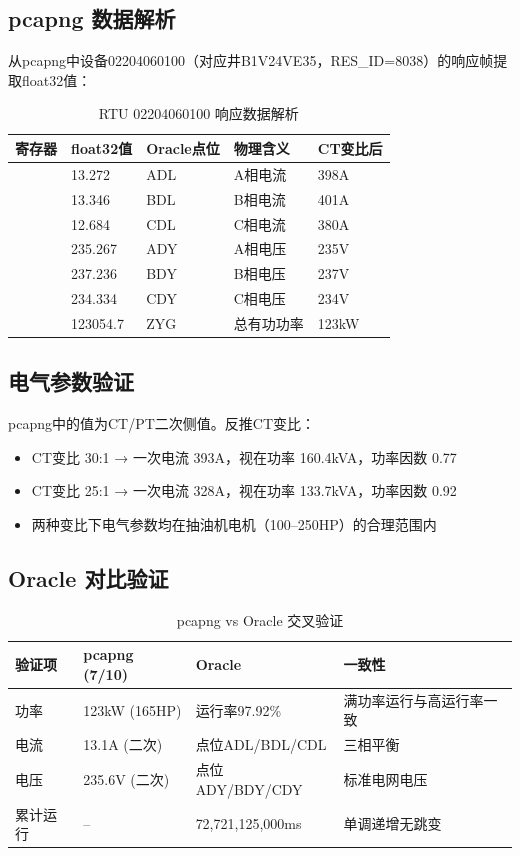 \documentclass[12pt,a4paper]{ctexart}
\begin{document}
\subsection{pcapng 数据解析}

从pcapng中设备02204060100（对应井B1V24VE35，RES\_ID=8038）的响应帧提取float32值：

\begin{table}[H]\centering
\caption{RTU 02204060100 响应数据解析}
\begin{tabular}{p{2.5cm}p{2.5cm}p{2.5cm}p{2.5cm}p{2.5cm}}
\toprule
\textbf{寄存器} & \textbf{float32值} & \textbf{Oracle点位} & \textbf{物理含义} & \textbf{CT变比后} \\
\midrule
[0] & 13.272 & ADL & A相电流 & 398A \\
[1] & 13.346 & BDL & B相电流 & 401A \\
[2] & 12.684 & CDL & C相电流 & 380A \\
[3] & 235.267 & ADY & A相电压 & 235V \\
[4] & 237.236 & BDY & B相电压 & 237V \\
[5] & 234.334 & CDY & C相电压 & 234V \\
[6] & 123054.7 & ZYG & 总有功功率 & 123kW \\
\bottomrule
\end{tabular}
\end{table}

\subsection{电气参数验证}

pcapng中的值为CT/PT二次侧值。反推CT变比：

\begin{itemize}[leftmargin=*]
  \item CT变比 30:1 → 一次电流 393A，视在功率 160.4kVA，功率因数 0.77
  \item CT变比 25:1 → 一次电流 328A，视在功率 133.7kVA，功率因数 0.92
  \item 两种变比下电气参数均在抽油机电机（100--250HP）的合理范围内
\end{itemize}

\subsection{Oracle 对比验证}

\begin{table}[H]\centering
\caption{pcapng vs Oracle 交叉验证}
\begin{tabular}{p{3cm}p{3cm}p{3cm}p{3cm}}
\toprule
\textbf{验证项} & \textbf{pcapng (7/10)} & \textbf{Oracle} & \textbf{一致性} \\
\midrule
功率 & 123kW (165HP) & 运行率97.92\% & 满功率运行与高运行率一致 \\
电流 & 13.1A (二次) & 点位ADL/BDL/CDL & 三相平衡 \\
电压 & 235.6V (二次) & 点位ADY/BDY/CDY & 标准电网电压 \\
累计运行 & -- & 72,721,125,000ms & 单调递增无跳变 \\
\bottomrule
\end{tabular}
\end{table}
\end{document}
